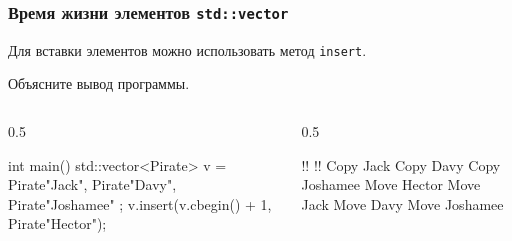\documentclass[compress, 8pt]{beamer}
\begin{document}
  \begin{frame}[fragile]

    \frametitle{Время жизни элементов \texttt{std::vector}}

    Для вставки элементов можно использовать метод \texttt{insert}.

    \begin{task}
      Объясните вывод программы.
    \end{task}

    \begin{columns}[T]

      \begin{column}{0.5\textwidth}

        \begin{mycppinplacelisting}
int main() {
    std::vector<Pirate> v = {
        Pirate{"Jack"},
        Pirate{"Davy"},
        Pirate{"Joshamee"}
    };
    v.insert(v.cbegin() + 1,
        Pirate{"Hector"});
}
        \end{mycppinplacelisting}

      \end{column}

      \begin{column}{0.5\textwidth}

        \begin{terminalwindow}
!!
!!
Copy Jack
Copy Davy
Copy Joshamee
Move Hector
Move Jack
Move Davy
Move Joshamee
        \end{terminalwindow}

      \end{column}

    \end{columns}

  \end{frame}
\end{document}
